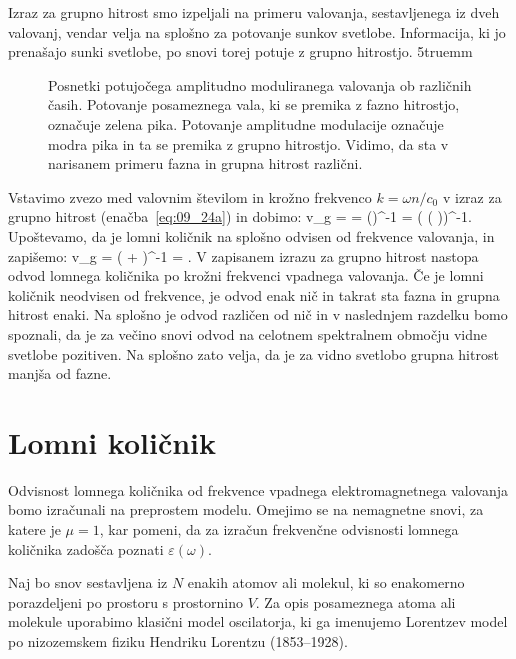Izraz za grupno hitrost smo izpeljali na primeru valovanja, sestavljenega iz dveh
valovanj, vendar velja na splošno za potovanje sunkov svetlobe. Informacija,
ki jo prenašajo sunki svetlobe, po snovi torej potuje z grupno hitrostjo.
\vglue5truemm
\begin{figure}[ht]
\centering
\def\svgwidth{130truemm} 

\caption{Posnetki potujočega amplitudno moduliranega valovanja ob različnih časih.
Potovanje posameznega vala, ki se premika z fazno hitrostjo, označuje zelena pika. Potovanje
amplitudne modulacije označuje modra pika in ta se premika z grupno 
hitrostjo. Vidimo, da sta v narisanem primeru fazna in grupna hitrost različni.}
\label{fig:09_disperzija}
\end{figure}

Vstavimo zvezo med valovnim številom in krožno frekvenco $k=\omega n /c_0$ v izraz za 
grupno hitrost (enačba~\ref{eq:09_24a}) in dobimo:
\beq
v_g =  = \left(\right)^{-1} = \left( \left( 
\right)\!\right)^{-1}\!\!.
\label{eq:09_25}
\eeq
Upoštevamo, da je lomni količnik na splošno odvisen od frekvence valovanja, in zapišemo:
\beq
v_g = \left( + \right)^{-1} = 
.
\label{eq:09_26}
\eeq
V zapisanem izrazu za grupno hitrost nastopa odvod lomnega količnika po krožni frekvenci vpadnega
valovanja. Če je lomni količnik neodvisen od frekvence, je odvod enak nič in 
takrat sta fazna in grupna hitrost enaki. Na splošno je odvod različen od nič in v naslednjem razdelku bomo
spoznali, da je za večino snovi odvod na celotnem spektralnem območju vidne svetlobe pozitiven.
Na splošno zato velja, da je za vidno svetlobo grupna hitrost manjša od fazne.

\section{Lomni količnik}
\label{chap:lomni}
Odvisnost lomnega količnika od frekvence vpadnega 
elektromagnetnega valovanja bomo izračunali na preprostem modelu. 
Omejimo se na nemagnetne snovi, za katere je $\mu = 1$, kar pomeni, da
za izračun frekvenčne odvisnosti lomnega količnika zadošča poznati 
$\varepsilon(\omega)$. 

Naj bo snov sestavljena iz $N$
enakih atomov ali molekul, ki so enakomerno porazdeljeni
po prostoru s prostornino $V$. Za opis posameznega atoma ali molekule uporabimo 
klasični model oscilatorja, ki ga imenujemo Lorentzev model 
po nizozemskem fiziku Hendriku Lorentzu (1853--1928). 


